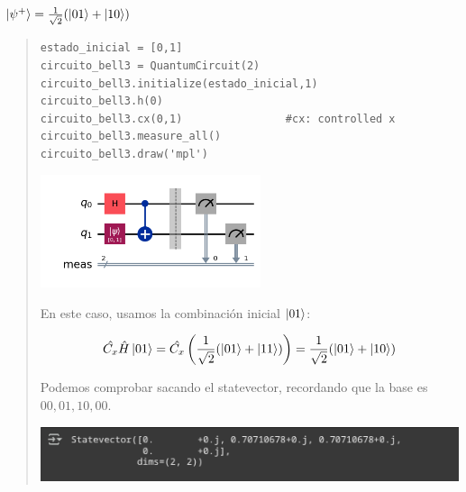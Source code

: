 \textbf{$\ket{\psi^+}=\frac{1}{\sqrt{2}} (\ket{01}+\ket{10})$} \vspace{.3cm}

\begin{quote}
    \begin{verbatim}
estado_inicial = [0,1]
circuito_bell3 = QuantumCircuit(2)
circuito_bell3.initialize(estado_inicial,1)
circuito_bell3.h(0)
circuito_bell3.cx(0,1)                #cx: controlled x
circuito_bell3.measure_all()
circuito_bell3.draw('mpl')
    \end{verbatim}
    \vspace{.3cm}
    \begin{center}
        \includegraphics[height=3.3cm]{src/Img/3.2.png}
    \end{center}

    En este caso, usamos la combinación inicial $\ket{01}$:

    \begin{align*}
        \hat{C_x}\hat{H}\ket{01}
        = \hat{C_x} \left( \frac{1}{\sqrt{2}} (\ket{01}+\ket{11}) \right)
        = \frac{1}{\sqrt{2}} (\ket{01}+\ket{10})
    \end{align*}

    Podemos comprobar sacando el statevector, recordando que la base es $00,01,10,00$.
    \vspace{.5cm}

    \begin{center}
        \includegraphics[width=.8\textwidth]{src/Img/3.2.r.png}
    \end{center}
\end{quote}
\vspace{.5cm}

